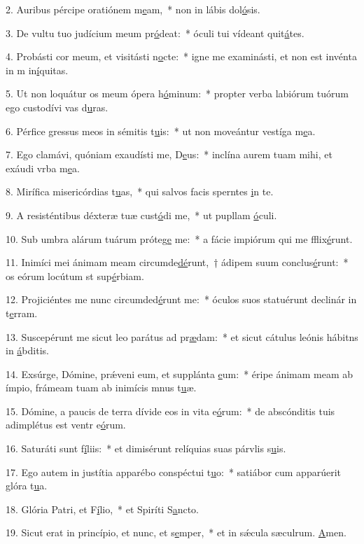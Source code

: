 2. Auribus pércipe oratiónem m\uline{e}am,~* non in lábis dol\uline{ó}sis.\par 
3. De vultu tuo judícium meum pr\uline{ó}deat:~* óculi tui vídeant quit\uline{á}tes.\par 
4. Probásti cor meum, et visitásti n\uline{o}cte:~* igne me examinásti, et non est invénta in m in\uline{í}quitas.\par 
5. Ut non loquátur os meum ópera h\uline{ó}minum:~* propter verba labiórum tuórum ego custodívi vas d\uline{u}ras.\par 
6. Pérfice gressus meos in sémitis t\uline{u}is:~* ut non moveántur vestíga m\uline{e}a.\par 
7. Ego clamávi, quóniam exaudísti me, D\uline{e}us:~* inclína aurem tuam mihi, et exáudi vrba m\uline{e}a.\par 
8. Mirífica misericórdias t\uline{u}as,~* qui salvos facis sperntes \uline{i}n te.\par 
9. A resisténtibus déxteræ tuæ cust\uline{ó}di me,~* ut pupllam \uline{ó}culi.\par 
10. Sub umbra alárum tuárum próteg\uline{e} me:~* a fácie impiórum qui me fflix\uline{é}runt.\par 
11. Inimíci mei ánimam meam circumde\uline{dé}runt,~† ádipem suum conclus\uline{é}runt:~* os eórum locútum st sup\uline{é}rbiam.\par 
12. Projiciéntes me nunc circumded\uline{é}runt me:~* óculos suos statuérunt declinár in t\uline{e}rram.\par 
13. Suscepérunt me sicut leo parátus ad pr\uline{æ}dam:~* et sicut cátulus leónis hábitns in \uline{á}bditis.\par 
14. Exsúrge, Dómine, prǽveni eum, et supplánta \uline{e}um:~* éripe ánimam meam ab ímpio, frámeam tuam ab inimícis mnus t\uline{u}æ.\par 
15. Dómine, a paucis de terra dívide eos in vita e\uline{ó}rum:~* de abscónditis tuis adimplétus est ventr e\uline{ó}rum.\par 
16. Saturáti sunt f\uline{í}liis:~* et dimisérunt relíquias suas párvlis s\uline{u}is.\par 
17. Ego autem in justítia apparébo conspéctui t\uline{u}o:~* satiábor cum apparúerit glóra t\uline{u}a.\par 
18. Glória Patri, et F\uline{í}lio,~* et Spiríti S\uline{a}ncto.\par 
19. Sicut erat in princípio, et nunc, et s\uline{e}mper,~* et in sǽcula sæculrum. \uline{A}men.\par 
